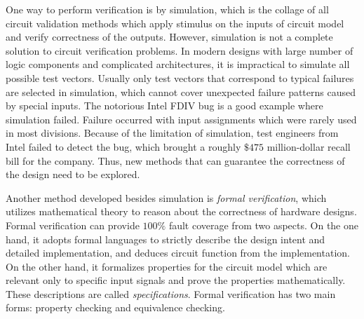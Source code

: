 One way to perform verification is by simulation, which is the collage of all circuit validation 
methods which apply stimulus on the inputs of circuit model and verify correctness of the outputs.
However, simulation is not a complete solution to circuit verification problems. In modern designs with 
large number of logic components and complicated architectures, it is impractical to simulate all possible 
test vectors. Usually only test vectors that correspond to typical failures are selected in simulation, which 
cannot cover unexpected failure patterns caused by special inputs. The notorious Intel FDIV bug \cite{nicely:FDIV}
is a good example where simulation failed. Failure occurred with input assignments which were rarely used in most divisions. Because of the limitation of simulation,  
test engineers from Intel failed to detect the bug,  which brought a roughly $\$475$ million-dollar recall bill
for the company. Thus,  new methods that can guarantee the correctness of the design need to be explored.

Another method developed besides simulation is \emph{formal verification}, which utilizes 
mathematical theory to reason about the correctness of hardware designs.
Formal verification can provide $100\%$ fault coverage from two aspects. On the one hand,  
it adopts formal languages to strictly describe the design intent and detailed implementation, 
and deduces circuit function from the implementation.
On the other hand,  it formalizes properties
for the circuit model which are relevant only to specific input signals and prove the properties mathematically. 
These descriptions are called {\it specifications}.
Formal verification has two main forms: property checking and equivalence 
checking. 

